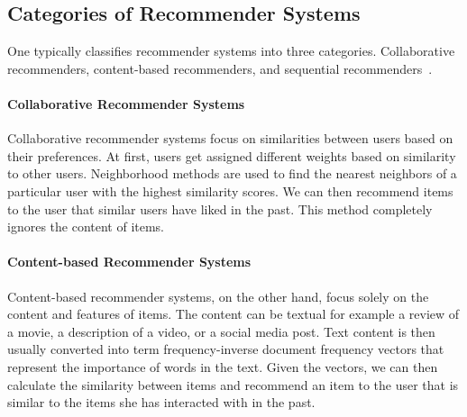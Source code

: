 \subsection{Categories of Recommender Systems}
One typically classifies recommender systems into three categories.
Collaborative recommenders, content-based recommenders, and sequential recommenders~\cite{melville2010recommender}.

\paragraph{Collaborative Recommender Systems}
Collaborative recommender systems focus on similarities between users based on their preferences. At first, users get assigned different weights based on similarity to other users. Neighborhood methods are used to find the nearest neighbors of a particular user with the highest similarity scores. We can then recommend items to the user that similar users have liked in the past. This method completely ignores the content of items.

\paragraph{Content-based Recommender Systems}
Content-based recommender systems, on the other hand, focus solely on the content and features of items. The content can be textual for example a review of a movie, a description of a video, or a social media post. Text content is then usually converted into term frequency-inverse document frequency vectors that represent the importance of words in the text. Given the vectors, we can then calculate the similarity between items and recommend an item to the user that is similar to the items she has interacted with in the past.

